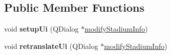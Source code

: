 \subsection*{Public Member Functions}
\begin{DoxyCompactItemize}
\item 
\mbox{\label{class_ui__modify_stadium_info_a1bc7fa7e327efff0a3686f47591c181f}} 
void {\bfseries setup\+Ui} (Q\+Dialog $\ast$\hyperlink{classmodify_stadium_info}{modify\+Stadium\+Info})
\item 
\mbox{\label{class_ui__modify_stadium_info_a9c3a37f6edfa5d0a4515c32f7df62db2}} 
void {\bfseries retranslate\+Ui} (Q\+Dialog $\ast$\hyperlink{classmodify_stadium_info}{modify\+Stadium\+Info})
\end{DoxyCompactItemize}
